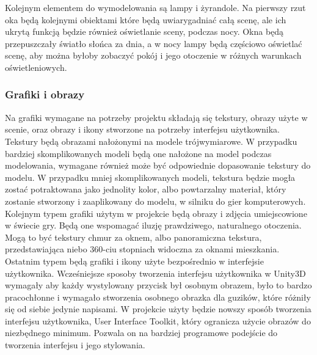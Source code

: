\documentclass{article} %
\begin{document}
            Kolejnym elementem do wymodelowania są lampy i żyrandole. Na pierwszy rzut oka będą kolejnymi obiektami które będą uwiarygadniać całą scenę, ale ich ukrytą funkcją będzie również oświetlanie sceny, podczas nocy. Okna będą przepuszczały światło słońca za dnia, a w nocy lampy będą częściowo oświetlać scenę, aby można byłoby zobaczyć pokój i jego otoczenie w różnych warunkach oświetleniowych.
            \\
            
        \subsubsection{Grafiki i obrazy}
            Na grafiki wymagane na potrzeby projektu składają się tekstury, obrazy użyte w scenie, oraz obrazy i ikony stworzone na potrzeby interfejsu użytkownika. 
            \\
            
            Tekstury będą obrazami nałożonymi na modele trójwymiarowe. W przypadku bardziej skomplikowanych modeli będą one nałożone na model podczas modelowania, wymagane również może być odpowiednie dopasowanie tekstury do modelu. W przypadku mniej skomplikowanych modeli, tekstura będzie mogła zostać potraktowana jako jednolity kolor, albo powtarzalny materiał, który zostanie stworzony i zaaplikowany do modelu, w silniku do gier komputerowych.
            \\
            
            Kolejnym typem grafiki użytym w projekcie będą obrazy i zdjęcia umiejscowione w świecie gry. Będą one wspomagać iluzję prawdziwego, naturalnego otoczenia. Mogą to być tekstury chmur za oknem, albo panoramiczna tekstura, przedstawiająca niebo 360-ciu stopniach widoczna za oknami mieszkania.
            \\
            
            Ostatnim typem będą grafiki i ikony użyte bezpośrednio w interfejsie użytkownika. Wcześniejsze sposoby tworzenia interfejsu użytkownika w Unity3D wymagały aby każdy wystylowany przycisk był osobnym obrazem, było to bardzo pracochłonne i wymagało stworzenia osobnego obrazka dla guzików, które różniły się od siebie jedynie napisami. W projekcie użyty będzie nowszy sposób tworzenia interfejsu użytkownika, User Interface Toolkit, który ogranicza użycie obrazów do niezbędnego minimum. Pozwala on na bardziej programowe podejście do tworzenia interfejsu i jego stylowania.
            \\
            
\end{document}
